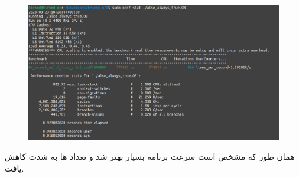 \begin{enumerate}
\begin{figure}[H]
        \centerline{\includegraphics[scale=0.35]{pics/5/D/also_always_true_better.png}}
    \end{figure}
    همان طور که مشخص است سرعت برنامه بسیار بهتر شد و تعداد
    ها
    به شدت کاهش یافت.


\end{enumerate}
